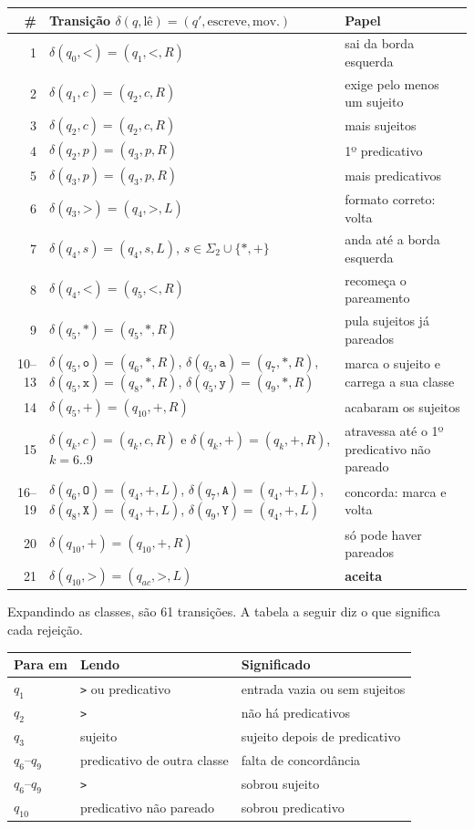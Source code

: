 \documentclass[11pt,a4paper]{article}
\newcommand{\cad}[1]{\texttt{#1}}       %
\begin{document}
{\small
\begin{longtable}{r p{8.8cm} p{5cm}}
\toprule
\# & Transição $\delta(q,\text{lê})=(q',\text{escreve},\text{mov.})$ & Papel \\
\midrule
\endhead
1 & $\delta(q_0,\cad{<})=(q_1,\cad{<},R)$ & sai da borda esquerda \\
2 & $\delta(q_1,c)=(q_2,c,R)$ & exige pelo menos um sujeito \\
3 & $\delta(q_2,c)=(q_2,c,R)$ & mais sujeitos \\
4 & $\delta(q_2,p)=(q_3,p,R)$ & 1º predicativo \\
5 & $\delta(q_3,p)=(q_3,p,R)$ & mais predicativos \\
6 & $\delta(q_3,\cad{>})=(q_4,\cad{>},L)$ & formato correto: volta \\
7 & $\delta(q_4,s)=(q_4,s,L)$, $s\in\Sigma_2\cup\{\cad{*},\cad{+}\}$ & anda até a borda esquerda \\
8 & $\delta(q_4,\cad{<})=(q_5,\cad{<},R)$ & recomeça o pareamento \\
9 & $\delta(q_5,\cad{*})=(q_5,\cad{*},R)$ & pula sujeitos já pareados \\
10--13 & $\delta(q_5,\cad{o})=(q_6,\cad{*},R)$, $\delta(q_5,\cad{a})=(q_7,\cad{*},R)$, $\delta(q_5,\cad{x})=(q_8,\cad{*},R)$, $\delta(q_5,\cad{y})=(q_9,\cad{*},R)$ & marca o sujeito e carrega a sua classe \\
14 & $\delta(q_5,\cad{+})=(q_{10},\cad{+},R)$ & acabaram os sujeitos \\
15 & $\delta(q_k,c)=(q_k,c,R)$ e $\delta(q_k,\cad{+})=(q_k,\cad{+},R)$, $k=6..9$ & atravessa até o 1º predicativo não pareado \\
16--19 & $\delta(q_6,\cad{O})=(q_4,\cad{+},L)$, $\delta(q_7,\cad{A})=(q_4,\cad{+},L)$, $\delta(q_8,\cad{X})=(q_4,\cad{+},L)$, $\delta(q_9,\cad{Y})=(q_4,\cad{+},L)$ & concorda: marca e volta \\
20 & $\delta(q_{10},\cad{+})=(q_{10},\cad{+},R)$ & só pode haver pareados \\
21 & $\delta(q_{10},\cad{>})=(q_{ac},\cad{>},L)$ & \textbf{aceita} \\
\bottomrule
\end{longtable}}

Expandindo as classes, são 61 transições. A tabela a seguir diz o que significa cada rejeição.

\begin{center}
\begin{tabular}{lll}
\toprule
Para em & Lendo & Significado \\
\midrule
$q_1$ & \cad{>} ou predicativo & entrada vazia ou sem sujeitos \\
$q_2$ & \cad{>} & não há predicativos \\
$q_3$ & sujeito & sujeito depois de predicativo \\
$q_6$--$q_9$ & predicativo de outra classe & falta de concordância \\
$q_6$--$q_9$ & \cad{>} & sobrou sujeito \\
$q_{10}$ & predicativo não pareado & sobrou predicativo \\
\bottomrule
\end{tabular}
\end{center}
\end{document}
